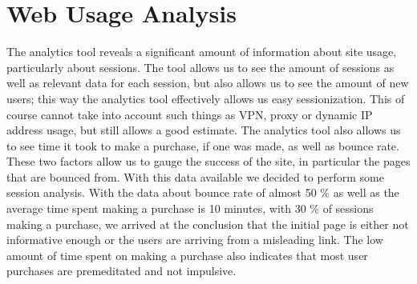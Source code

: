 \section{Web Usage Analysis}
The analytics tool reveals a significant amount of information about site usage, particularly about sessions.
The tool allows us to see the amount of sessions as well as relevant data for each session, but also allows us to see the amount of new users; this way the analytics tool effectively allows us easy sessionization.
This of course cannot take into account such things as VPN, proxy or dynamic IP address usage, but still allows a good estimate.
The analytics tool also allows us to see time it took to make a purchase, if one was made, as well as bounce rate.
These two factors allow us to gauge the success of the site, in particular the pages that are bounced from.
With this data available we decided to perform some session analysis.
With the data about bounce rate of almost 50 \% as well as the average time spent making a purchase is 10 minutes, with 30 \% of sessions making a purchase, we arrived at the conclusion that the initial page is either not informative enough or the users are arriving from a misleading link.
The low amount of time spent on making a purchase also indicates that most user purchases are premeditated and not impulsive.
